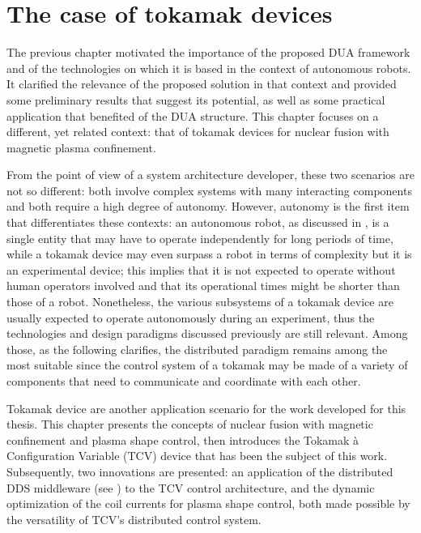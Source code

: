 \chapter{The case of tokamak devices}
\label{ch:tokamaks}
\doublespacing
\vspace{-2.5cm}

The previous chapter motivated the importance of the proposed DUA framework and of the technologies on which it is based in the context of autonomous robots. It clarified the relevance of the proposed solution in that context and provided some preliminary results that suggest its potential, as well as some practical application that benefited of the DUA structure. This chapter focuses on a different, yet related context: that of tokamak devices for nuclear fusion with magnetic plasma confinement.

From the point of view of a system architecture developer, these two scenarios are not so different: both involve complex systems with many interacting components and both require a high degree of autonomy. However, autonomy is the first item that differentiates these contexts: an autonomous robot, as discussed in , is a single entity that may have to operate independently for long periods of time, while a tokamak device may even surpass a robot in terms of complexity but it is an experimental device; this implies that it is not expected to operate without human operators involved and that its operational times might be shorter than those of a robot. Nonetheless, the various subsystems of a tokamak device are usually expected to operate autonomously during an experiment, thus the technologies and design paradigms discussed previously are still relevant. Among those, as the following clarifies, the distributed paradigm remains among the most suitable since the control system of a tokamak may be made of a variety of components that need to communicate and coordinate with each other.

Tokamak device are another application scenario for the work developed for this thesis. This chapter presents the concepts of nuclear fusion with magnetic confinement and plasma shape control, then introduces the Tokamak à Configuration Variable (TCV) device that has been the subject of this work. Subsequently, two innovations are presented: an application of the distributed DDS middleware (see ) to the TCV control architecture, and the dynamic optimization of the coil currents for plasma shape control, both made possible by the versatility of TCV's distributed control system.




